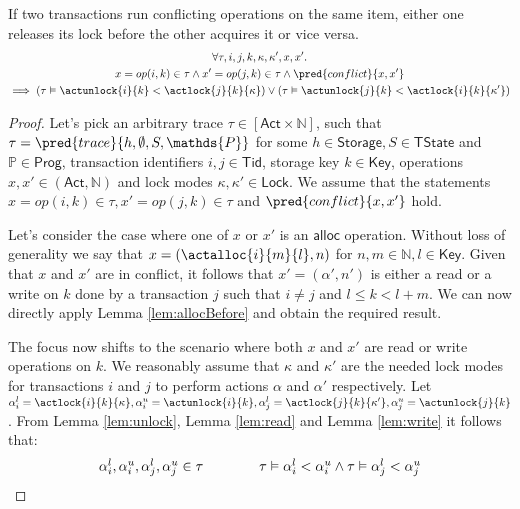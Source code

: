 \lem \label{lem:conflict} If two transactions run conflicting operations on the same item, either one releases its lock before the other acquires it or vice versa.
\begin{gather*}
\forall \tau, i, j, k, \kappa, \kappa', x, x' \ldotp \\
x = op(i, k) \in \tau \land x' = op(j, k) \in \tau \land \pred{conflict}{x, x'} \\
\implies \left( \tau \vDash \actunlock{i}{k} < \actlock{j}{k}{\kappa} \right) \lor \left( \tau \vDash \actunlock{j}{k} < \actlock{i}{k}{\kappa'} \right)
\end{gather*}

\begin{proof}
Let's pick an arbitrary trace $\tau \in [\mathsf{Act} \times \mathds{N}]$, such that $\tau = \pred{trace}{h, \emptyset, S, \mathds{P}}$ for some $h \in \mathsf{Storage}, S \in \mathsf{TState}$ and $\mathds{P} \in \mathsf{Prog}$, transaction identifiers $i, j \in \mathsf{Tid}$, storage key $k \in \mathsf{Key}$, operations $x, x' \in (\mathsf{Act}, \mathds{N})$ and lock modes $\kappa, \kappa' \in \mathsf{Lock}$. We assume that the statements $x = op(i, k) \in \tau, x' = op(j, k) \in \tau$ and $\pred{conflict}{x, x'}$ hold.

Let's consider the case where one of $x$ or $x'$ is an $\mathsf{alloc}$ operation. Without loss of generality we say that $x = (\actalloc{i}{m}{l}, n)$ for $n, m \in \mathds{N}, l \in \mathsf{Key}$. Given that $x$ and $x'$ are in conflict, it follows that $x' = (\alpha', n')$ is either a read or a write on $k$ done by a transaction $j$ such that $i \neq j$ and $l \leq k < l + m$. We can now directly apply Lemma \ref{lem:allocBefore} and obtain the required result.

The focus now shifts to the scenario where both $x$ and $x'$ are read or write operations on $k$. We  reasonably assume that $\kappa$ and $\kappa'$ are the needed lock modes for transactions $i$ and $j$ to perform actions $\alpha$ and $\alpha'$ respectively. Let $\alpha_i^l = \actlock{i}{k}{\kappa}, \alpha_i^u = \actunlock{i}{k}, \alpha_j^l = \actlock{j}{k}{\kappa'}, \alpha_j^u = \actunlock{j}{k}$. From Lemma \ref{lem:unlock}, Lemma \ref{lem:read} and Lemma \ref{lem:write} it follows that:
\begin{gather}
	\label{lem:conflict1}
	\begin{array}{c @{\hspace{40pt}} c}
		\alpha_i^l, \alpha_i^u, \alpha_j^l, \alpha_j^u \in \tau
		&
		\tau \vDash \alpha_i^l < \alpha_i^u \land \tau \vDash \alpha_j^l < \alpha_j^u
	\end{array}
\end{gather}


\end{proof}
